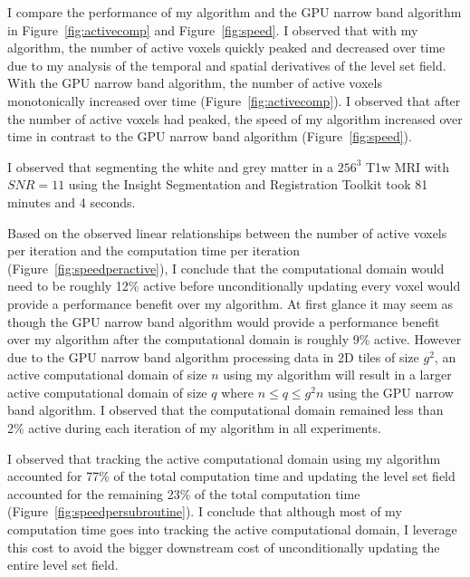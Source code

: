 I compare the performance of my algorithm and the GPU narrow band algorithm in Figure~\ref{fig:activecomp} and Figure~\ref{fig:speed}. I observed that with my algorithm, the number of active voxels quickly peaked and decreased over time due to my analysis of the temporal and spatial derivatives of the level set field. With the GPU narrow band algorithm, the number of active voxels monotonically increased over time (Figure~\ref{fig:activecomp}). I observed that after the number of active voxels had peaked, the speed of my algorithm increased over time in contrast to the GPU narrow band algorithm (Figure~\ref{fig:speed}).

I observed that segmenting the white and grey matter in a ${256}^3$ T1w MRI with $SNR=11$ using the Insight Segmentation and Registration Toolkit took 81 minutes and 4 seconds.

Based on the observed linear relationships between the number of active voxels per iteration and the computation time per iteration (Figure~\ref{fig:speedperactive}), I conclude that the computational domain would need to be roughly 12\% active before unconditionally updating every voxel would provide a performance benefit over my algorithm. At first glance it may seem as though the GPU narrow band algorithm would provide a performance benefit over my algorithm after the computational domain is roughly 9\% active. However due to the GPU narrow band algorithm processing data in 2D tiles of size $g^2$, an active computational domain of size $n$ using my algorithm will result in a larger active computational domain of size $q$ where $n\le q\le g^2n$ using the GPU narrow band algorithm. I observed that the computational domain remained less than 2\% active during each iteration of my algorithm in all experiments.


I observed that tracking the active computational domain using my algorithm accounted for 77\% of the total computation time and updating the level set field accounted for the remaining 23\% of the total computation time (Figure~\ref{fig:speedpersubroutine}). I conclude that although most of my computation time goes into tracking the active computational domain, I leverage this cost to avoid the bigger downstream cost of unconditionally updating the entire level set field.

